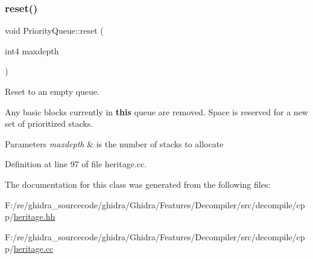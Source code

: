 \subsubsection{\texorpdfstring{reset()}{reset()}}
{\footnotesize\ttfamily void Priority\+Queue\+::reset (\begin{DoxyParamCaption}\item[{int4}]{maxdepth }\end{DoxyParamCaption})}



Reset to an empty queue. 

Any basic blocks currently in {\bfseries{this}} queue are removed. Space is reserved for a new set of prioritized stacks. 
\begin{DoxyParams}{Parameters}
{\em maxdepth} & is the number of stacks to allocate \\
\hline
\end{DoxyParams}


Definition at line 97 of file heritage.\+cc.



The documentation for this class was generated from the following files\+:\begin{DoxyCompactItemize}
\item 
F\+:/re/ghidra\+\_\+sourcecode/ghidra/\+Ghidra/\+Features/\+Decompiler/src/decompile/cpp/\mbox{\hyperlink{heritage_8hh}{heritage.\+hh}}\item 
F\+:/re/ghidra\+\_\+sourcecode/ghidra/\+Ghidra/\+Features/\+Decompiler/src/decompile/cpp/\mbox{\hyperlink{heritage_8cc}{heritage.\+cc}}\end{DoxyCompactItemize}
